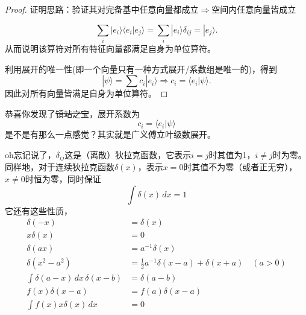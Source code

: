 \documentclass[12pt,a4paper,openany,twoside]{book}
\numberwithin{equation}{section}
\newcommand{\ket}[1]{| #1 \rangle}
\newcommand{\bracket}[2]{\langle #1 | #2 \rangle}
\begin{document}
    \begin{proof}
    	证明思路：验证其对完备基中任意向量都成立$\Rightarrow$空间内任意向量皆成立

\begin{equation}
	\sum_i \ket{e_i}\bracket{e_i}{e_j} = \sum_i\ket{e_i} \delta_{ij} = \ket{e_j}.
\end{equation}
从而说明该算符对所有特征向量都满足自身为单位算符。

利用展开的唯一性(即一个向量只有一种方式展开/系数组是唯一的)，得到
\begin{equation}
\ket{\psi} = \sum c_i \ket{e_i} \Rightarrow c_i = \bracket{e_i}{\psi}.
\end{equation}
因此对所有向量皆满足自身为单位算符。
    \end{proof}
    恭喜你发现了\sout{镇站之宝}，展开系数为
    \begin{equation}
      c_i = \langle e_i | \psi \rangle 
      \label{expansion coeff}
    \end{equation}
    是不是有那么一点感觉？其实就是广义傅立叶级数展开。

    oh忘记说了，$\delta_{ij}$这是（离散）狄拉克函数，它表示$i=j$时其值为1，$i\neq j$时为零。同样地，对于连续狄拉克函数$\delta(x)$，表示$x=0$时其值不为零（或者正无穷），$x\neq 0$时恒为零，同时保证
    \begin{equation}
	    \int \delta(x) \, dx = 1 
    \end{equation}
    它还有这些性质，
    \begin{align}
\delta(-x) & = \delta(x) \\
x\delta(x) & = 0 \\
\delta(a x) & = a^{-1} \delta(x)\\
\delta(x^2-a^2) & = \frac{1}{2} a^{-1} {\delta(x-a)+\delta(x+a)} \quad (a>0)\\
\int \delta(a-x) \, dx \, \delta(x-b) & = \delta(a-b) \\
f(x) \delta(x-a) &=  f(a)\delta(x-a)\\
\int f(x)x\delta(x) \, dx & = 0
\end{align}
\end{document}
